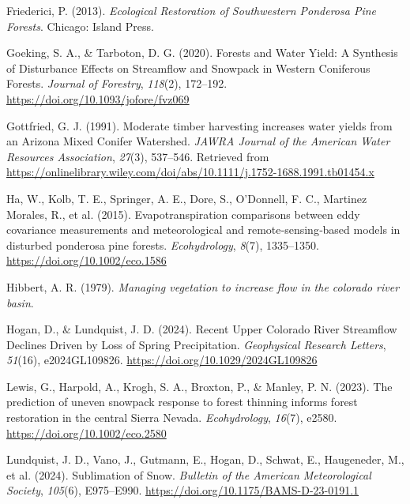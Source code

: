 \documentclass[
]{agujournal2019}
\newlength{\cslhangindent}
\newenvironment{CSLReferences}[2] %
 {\begin{list}{}{%
  \setlength{\itemindent}{0pt}
  \setlength{\leftmargin}{0pt}
  \setlength{\parsep}{0pt}
  \ifodd #1
   \setlength{\leftmargin}{\cslhangindent}
   \setlength{\itemindent}{-1\cslhangindent}
  \fi
  \setlength{\itemsep}{#2\baselineskip}}}
 {\end{list}}
\begin{document}
\begin{CSLReferences}{1}{0}
Friederici, P. (2013). \emph{Ecological Restoration of Southwestern
Ponderosa Pine Forests}. Chicago: Island Press.

Goeking, S. A., \& Tarboton, D. G. (2020). Forests and {Water} {Yield}:
{A} {Synthesis} of {Disturbance} {Effects} on {Streamflow} and
{Snowpack} in {Western} {Coniferous} {Forests}. \emph{Journal of
Forestry}, \emph{118}(2), 172--192.
\url{https://doi.org/10.1093/jofore/fvz069}

Gottfried, G. J. (1991). Moderate timber harvesting increases water
yields from an {Arizona} {Mixed} {Conifer} {Watershed}. \emph{JAWRA
Journal of the American Water Resources Association}, \emph{27}(3),
537--546. Retrieved from
\url{https://onlinelibrary.wiley.com/doi/abs/10.1111/j.1752-1688.1991.tb01454.x}

Ha, W., Kolb, T. E., Springer, A. E., Dore, S., O'Donnell, F. C.,
Martinez Morales, R., et al. (2015). Evapotranspiration comparisons
between eddy covariance measurements and meteorological and
remote‐sensing‐based models in disturbed ponderosa pine forests.
\emph{Ecohydrology}, \emph{8}(7), 1335--1350.
\url{https://doi.org/10.1002/eco.1586}

Hibbert, A. R. (1979). \emph{Managing vegetation to increase flow in the
colorado river basin}.

Hogan, D., \& Lundquist, J. D. (2024). Recent {Upper} {Colorado} {River}
{Streamflow} {Declines} {Driven} by {Loss} of {Spring} {Precipitation}.
\emph{Geophysical Research Letters}, \emph{51}(16), e2024GL109826.
\url{https://doi.org/10.1029/2024GL109826}

Lewis, G., Harpold, A., Krogh, S. A., Broxton, P., \& Manley, P. N.
(2023). The prediction of uneven snowpack response to forest thinning
informs forest restoration in the central {Sierra} {Nevada}.
\emph{Ecohydrology}, \emph{16}(7), e2580.
\url{https://doi.org/10.1002/eco.2580}

Lundquist, J. D., Vano, J., Gutmann, E., Hogan, D., Schwat, E.,
Haugeneder, M., et al. (2024). Sublimation of {Snow}. \emph{Bulletin of
the American Meteorological Society}, \emph{105}(6), E975--E990.
\url{https://doi.org/10.1175/BAMS-D-23-0191.1}


\end{CSLReferences}
\end{document}
